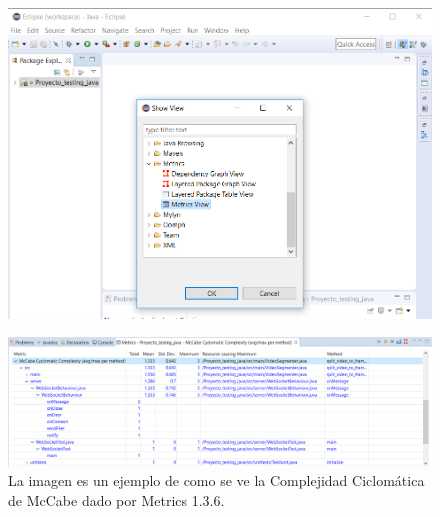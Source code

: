 \documentclass[a4paper]{article}
\begin{document}
\begin{figure}
  \centering
  \includegraphics[scale=0.5]{Mostrar_2}
\end{figure}

\begin{figure}
  \centering
  \includegraphics[scale=0.5]{Mostrar_3}
  \caption{La imagen es un ejemplo de como se ve la Complejidad Ciclomática de McCabe dado por Metrics 1.3.6.}
\end{figure}
\newpage
\color{Blue}
\end{document}
